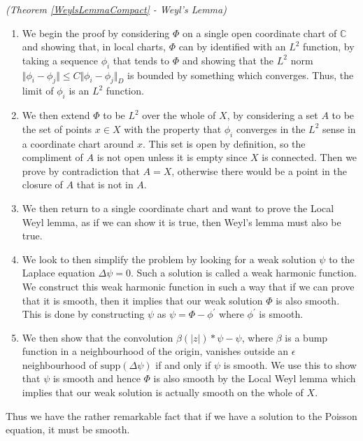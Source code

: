 \documentclass[11pt]{report}
\theoremstyle{definition}
\newenvironment{sproof}{%
  \renewcommand{\proofname}{Sketch Proof}\proof}{\endproof}
\begin{document}
\begin{sproof}\emph{(Theorem \ref{WeylsLemmaCompact} - Weyl's Lemma)}
  \hspace{1pt}
  \begin{enumerate}
    \item We begin the proof by considering $\Phi$ on a single open coordinate chart of $\mathbb{C}$ and showing that, in local charts, $\Phi$ can by identified with an $L^2$ function, by taking a sequence $\phi_i$ that tends to $\Phi$ and showing that the $L^2$ norm $\Vert \phi_i - \phi_j \Vert \leq C \Vert \phi_i - \phi_j \Vert_D$ is bounded by something which converges. Thus, the limit of $\phi_i$ is an $L^2$ function.
    \item We then extend $\Phi$ to be $L^2$ over the whole of $X$, by considering a set $A$ to be the set of points $x \in X$ with the property that $\phi_i$ converges in the $L^2$ sense in a coordinate chart around $x$. This set is open by definition, so the compliment of $A$ is not open unless it is empty since $X$ is connected. Then we prove by contradiction that $A = X$, otherwise there would be a point in the closure of $A$ that is not in $A$.
    \item We then return to a single coordinate chart and want to prove the Local Weyl lemma, as if we can show it is true, then Weyl's lemma must also be true.
    \item We look to then simplify the problem by looking for a weak solution $\psi$ to the Laplace equation $\Delta \psi = 0$. Such a solution is called a weak harmonic function. We construct this weak harmonic function in such a way that if we can prove that it is smooth, then it implies that our weak solution $\Phi$ is also smooth. This is done by constructing $\psi$ as $\psi = \Phi - \phi^{\prime}$ where $\phi^{\prime}$ is smooth.
    \item We then show that the convolution $\beta(|z|)*\psi - \psi$, where $\beta$ is a bump function in a neighbourhood of the origin, vanishes outside an $\epsilon$ neighbourhood of $\text{supp}(\Delta \psi)$ if and only if $\psi$ is smooth. We use this to show that $\psi$ is smooth and hence $\Phi$ is also smooth by the Local Weyl lemma which implies that our weak solution is actually smooth on the whole of $X$.
  \end{enumerate}
  Thus we have the rather remarkable fact that if we have a solution to the Poisson equation, it must be smooth.
\end{sproof}
\end{document}
